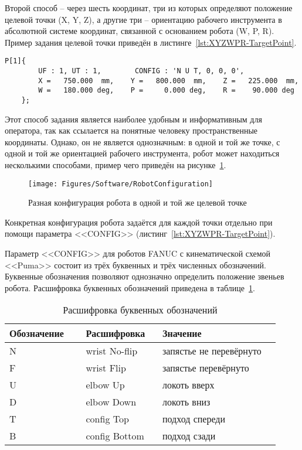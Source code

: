Второй способ -- через шесть координат, три из которых определяют положение целевой точки (X, Y, Z), а другие три -- ориентацию рабочего инструмента в абсолютной системе координат, связанной с основанием робота (W, P, R).
Пример задания целевой точки приведён в листинге~\ref{lst:XYZWPR-TargetPoint}.

\begin{lstlisting}[caption={Задание целевой точки с помощью координат XYZWPR}, label={lst:XYZWPR-TargetPoint}]
	P[1]{
		UF : 1, UT : 1,        CONFIG : 'N U T, 0, 0, 0',
		X =   750.000  mm,    Y =   800.000  mm,    Z =   225.000  mm,
		W =   180.000 deg,    P =     0.000 deg,    R =    90.000 deg
	};
\end{lstlisting}

Этот способ задания является наиболее удобным и информативным для оператора, так как ссылается на понятные человеку пространственные координаты.
Однако, он не является однозначным: в одной и той же точке, с одной и той же ориентацией рабочего инструмента, робот может находиться несколькими способами, пример чего приведён на рисунке~\ref{fig:RobotConfiguration}.

\begin{figure}[H]
    \centering
    \vspace{14pt}
    \texttt{[image: Figures/Software/RobotConfiguration]}
    \caption{Разная конфигурация робота в одной и той же целевой точке}
    \label{fig:RobotConfiguration}
\end{figure}

Конкретная конфигурация робота задаётся для каждой точки отдельно при помощи параметра <<CONFIG>> (листинг~\ref{lst:XYZWPR-TargetPoint}).

Параметр <<CONFIG>> для роботов FANUC с кинематической схемой <<Puma>> состоит из трёх буквенных и трёх численных обозначений.
Буквенные обозначения позволяют однозначно определить положение звеньев робота.
Расшифровка буквенных обозначений приведена в таблице~\ref{tab:RobotConfig}.

\begin{table}[H]
    \caption{Расшифровка буквенных обозначений}
    \label{tab:RobotConfig}
    \begin{tabular}{|p{0.26\linewidth}|p{0.26\linewidth}|p{0.4\linewidth}|}
        \hline
        Обозначение & Расшифровка   & Значение                \\ \hline
        N           & wrist No-flip & запястье не перевёрнуто \\ \hline
        F           & wrist Flip    & запястье перевёрнуто    \\ \hline
        U           & elbow Up      & локоть вверх            \\ \hline
        D           & elbow Down    & локоть вниз             \\ \hline
        T           & config Top    & подход спереди          \\ \hline
        B           & config Bottom & подход сзади            \\ \hline
    \end{tabular}
\end{table}

